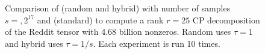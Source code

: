 \documentclass{siamonline181217mod}
\begin{document}
\begin{figure}
{}
  \caption{Comparison of \cprandlev (random and hybrid) with number of samples $s=,2^{17}$ and \cpals (standard)
   to compute a rank $r=25$ CP decomposition of the Reddit tensor with 4.68 billion nonzeros.  
   Random uses $\tau=1$ and hybrid uses $\tau = 1/s$. Each experiment is run 10 times. }
  \label{fig:reddit}
\end{figure} %
\end{document}

